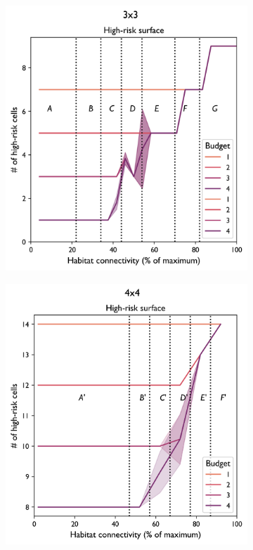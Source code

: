 \begin{figure}[H]
     \centering
     \begin{subfigure}[b]{0.4\textwidth}
         \centering
         \includegraphics[width=.98\textwidth]{figures/wildland/risky_surface3.png}
         \caption{}
         \label{fig:indicator_surface3}
     \end{subfigure}
     \begin{subfigure}[b]{0.4\textwidth}
         \centering
         \includegraphics[width=\textwidth]{figures/wildland/risky_surface4.png}

\end{subfigure}
\end{figure}
